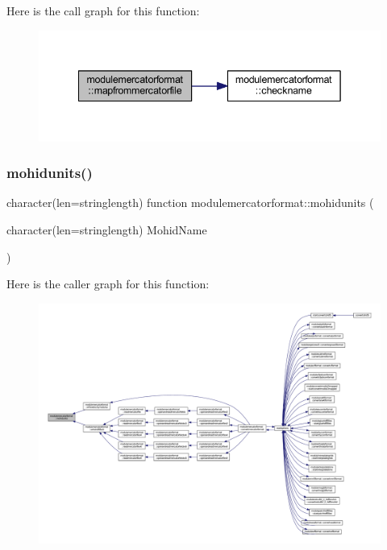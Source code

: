 Here is the call graph for this function\+:\nopagebreak
\begin{figure}[H]
\begin{center}
\leavevmode
\includegraphics[width=342pt]{namespacemodulemercatorformat_a99c34f27fc6fb0d01e289f47e4e8a27b_cgraph}
\end{center}
\end{figure}
\mbox{\label{namespacemodulemercatorformat_afcc318c8448502d22aecff9e1bf75f91}} 
\subsubsection{\texorpdfstring{mohidunits()}{mohidunits()}}
{\footnotesize\ttfamily character(len=stringlength) function modulemercatorformat\+::mohidunits (\begin{DoxyParamCaption}\item[{character(len=stringlength)}]{Mohid\+Name }\end{DoxyParamCaption})\hspace{0.3cm}{\ttfamily [private]}}

Here is the caller graph for this function\+:\nopagebreak
\begin{figure}[H]
\begin{center}
\leavevmode
\includegraphics[width=350pt]{namespacemodulemercatorformat_afcc318c8448502d22aecff9e1bf75f91_icgraph}
\end{center}
\end{figure}
\mbox{\label{namespacemodulemercatorformat_a856b781d5405606ffbd1e7409a516633}} 

